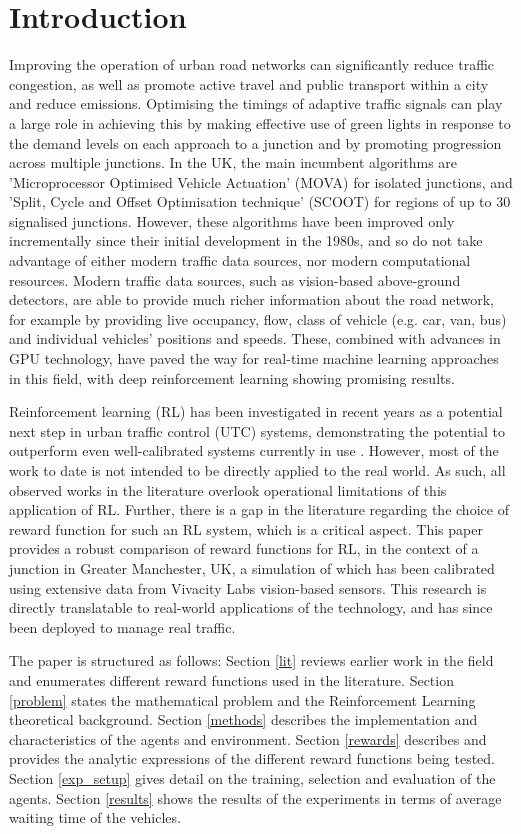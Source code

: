 \documentclass{article}
\begin{document}
\section{Introduction}
Improving the operation of urban road networks can significantly reduce traffic congestion, as well as promote active travel and public transport within a city and reduce emissions.
Optimising the timings of adaptive traffic signals can play a large role in achieving this by making effective use of green lights in response to the demand levels on each approach to a junction and by promoting progression across multiple junctions.
In the UK, the main incumbent algorithms are 'Microprocessor Optimised Vehicle Actuation' (MOVA) \cite{MOVA} for isolated junctions, and 'Split, Cycle and Offset Optimisation technique' (SCOOT) \cite{SCOOT} for regions of  up to 30 signalised junctions.
However, these algorithms have been improved only incrementally since their initial development in the 1980s, and so do not take advantage of either modern traffic data sources, nor modern computational resources. Modern traffic data sources, such as vision-based above-ground detectors, are able to provide much richer information about the road network, for example by providing live occupancy, flow, class of vehicle (e.g. car, van, bus) and individual vehicles' positions and speeds.
These, combined with advances in GPU technology, have paved the way for real-time machine learning approaches in this field, with deep reinforcement learning showing promising results. 

Reinforcement learning (RL) has been investigated in recent years as a potential next step in urban traffic control (UTC) systems, demonstrating the potential to outperform even well-calibrated systems currently in use \cite{wei2019a}.
However, most of the work to date is not intended to be directly applied to the real world. As such, all observed works in the literature overlook operational limitations of this application of RL.
Further, there is a gap in the literature regarding the choice of reward function for such an RL system, which is a critical aspect.
This paper provides a robust comparison of reward functions for RL, in the context of a junction in Greater Manchester, UK, a simulation of which has been calibrated using extensive data from Vivacity Labs vision-based sensors.
This research is directly translatable to real-world applications of the technology, and has since been deployed to manage real traffic. 

The paper is structured as follows: Section \ref{lit} reviews earlier work in the field and enumerates different reward functions used in the literature.
Section \ref{problem} states the mathematical problem and the Reinforcement Learning theoretical background.
Section \ref{methods} describes the implementation and characteristics of the agents and environment.
Section \ref{rewards} describes and provides the analytic expressions of the different reward functions being tested.
Section \ref{exp_setup} gives detail on the training, selection and evaluation of the agents.
Section \ref{results} shows the results of the experiments in terms of average waiting time of the vehicles.
\end{document}
